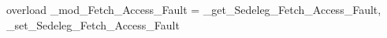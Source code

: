 overload _mod_Fetch_Access_Fault = {_get_Sedeleg_Fetch_Access_Fault, _set_Sedeleg_Fetch_Access_Fault}